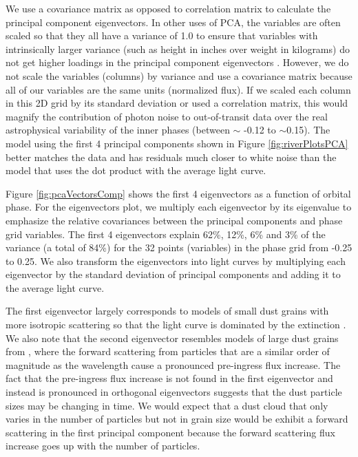 \documentclass[preprint]{aastex61}
\begin{document}
We use a covariance matrix as opposed to correlation matrix to calculate the principal component eigenvectors.
In other uses of PCA, the variables are often scaled so that they all have a variance of 1.0 to ensure that variables with intrinsically larger variance (such as height in inches over weight in kilograms) do not get higher loadings in the principal component eigenvectors \citep{jolliffe2002pca}.
However, we do not scale the variables (columns) by variance and use a covariance matrix because all of our variables are the same units (normalized flux).
If we scaled each column in this 2D grid by its standard deviation or used a correlation matrix, this would magnify the contribution of photon noise to out-of-transit data over the real astrophysical variability of the inner phases (between $\sim$ -0.12 to $\sim$0.15).
The model using the first 4 principal components shown in Figure \ref{fig:riverPlotsPCA} better matches the data and has residuals much closer to white noise than the model that uses the dot product with the average light curve.

Figure \ref{fig:pcaVectorsComp} shows the first 4 eigenvectors as a function of orbital phase.
For the eigenvectors plot, we multiply each eigenvector by its eigenvalue to emphasize the relative covariances between the principal components and phase grid variables.
The first 4 eigenvectors explain 62\%, 12\%, 6\% and 3\% of the variance (a total of 84\%) for the 32 points (variables) in the phase grid from -0.25 to 0.25.
We also transform the eigenvectors into light curves by multiplying each eigenvector by the standard deviation of principal components and adding it to the average light curve.

The first eigenvector largely corresponds to models of small dust grains with more isotropic scattering so that the light curve is dominated by the extinction \citep{budaj12}.
We also note that the second eigenvector resembles models of large dust grains from \citet{budaj12}, where the forward scattering from particles that are a similar order of magnitude as the wavelength cause a pronounced pre-ingress flux increase.
The fact that the pre-ingress flux increase is not found in the first eigenvector and instead is pronounced in orthogonal eigenvectors suggests that the dust particle sizes may be changing in time.
We would expect that a dust cloud that only varies in the number of particles but not in grain size would be exhibit a forward scattering in the first principal component because the forward scattering flux increase goes up with the number of particles.
\end{document}
